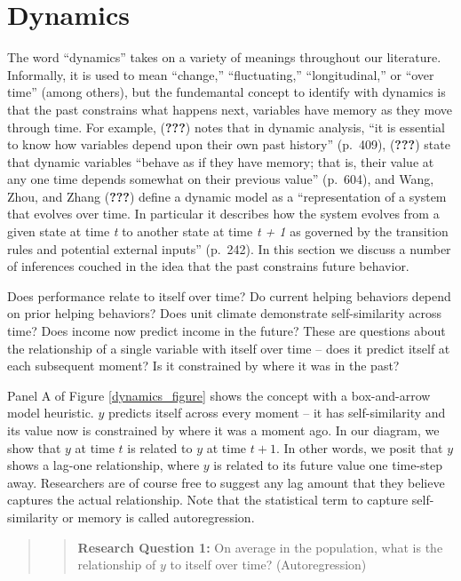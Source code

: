\documentclass[english,,man]{apa6}
\begin{document}
\hypertarget{dynamics}{%
\section{Dynamics}\label{dynamics}}

The word \enquote{dynamics} takes on a variety of meanings throughout our literature. Informally, it is used to mean \enquote{change,} \enquote{fluctuating,} \enquote{longitudinal,} or \enquote{over time} (among others), but the fundemantal concept to identify with dynamics is that the past constrains what happens next, variables have memory as they move through time. For example, ({\textbf{???}}) notes that in dynamic analysis, \enquote{it is essential to know how variables depend upon their own past history} (p.~409), ({\textbf{???}}) state that dynamic variables \enquote{behave as if they have memory; that is, their value at any one time depends somewhat on their previous value} (p.~604), and Wang, Zhou, and Zhang ({\textbf{???}}) define a dynamic model as a \enquote{representation of a system that evolves over time. In particular it describes how the system evolves from a given state at time \emph{t} to another state at time \emph{t + 1} as governed by the transition rules and potential external inputs} (p.~242). In this section we discuss a number of inferences couched in the idea that the past constrains future behavior.

Does performance relate to itself over time? Do current helping behaviors depend on prior helping behaviors? Does unit climate demonstrate self-similarity across time? Does income now predict income in the future? These are questions about the relationship of a single variable with itself over time -- does it predict itself at each subsequent moment? Is it constrained by where it was in the past?

Panel A of Figure \ref{dynamics_figure} shows the concept with a box-and-arrow model heuristic. \(y\) predicts itself across every moment -- it has self-similarity and its value now is constrained by where it was a moment ago. In our diagram, we show that \(y\) at time \(t\) is related to \(y\) at time \(t + 1\). In other words, we posit that \(y\) shows a lag-one relationship, where \(y\) is related to its future value one time-step away. Researchers are of course free to suggest any lag amount that they believe captures the actual relationship. Note that the statistical term to capture self-similarity or memory is called autoregression.

\begin{quote}
\begin{quote}
\textbf{Research Question 1:} On average in the population, what is the relationship of \(y\) to itself over time? (Autoregression)
\end{quote}
\end{quote}
\end{document}
